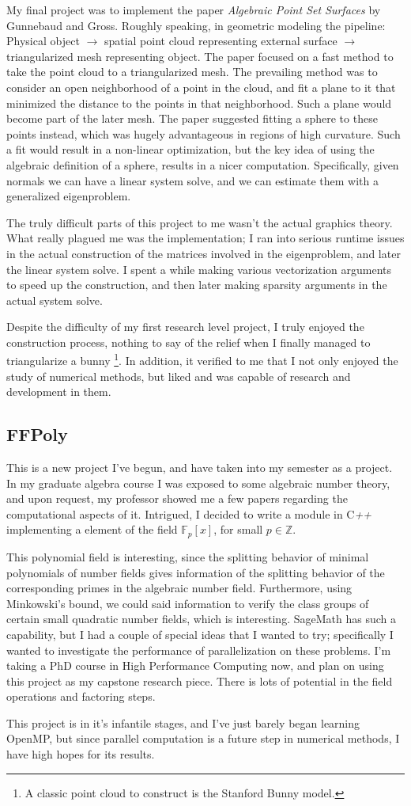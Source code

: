 \documentclass[12pt]{article}
\begin{document}
My final project was to implement the paper \textit{Algebraic Point Set
Surfaces} by Gunnebaud and Gross. Roughly speaking, in geometric modeling the
pipeline: Physical object $\to$ spatial point cloud representing external
surface $\to$ triangularized mesh representing object. The paper focused on a
fast method to take the point cloud to a triangularized mesh. The prevailing
method was to consider an open neighborhood of a point in the cloud, and fit a
plane to it that minimized the distance to the points in that neighborhood. Such
a plane would become part of the later mesh. The paper suggested fitting a
sphere to these points instead, which was hugely advantageous in regions of high
curvature. Such a fit would result in a non-linear optimization, but the key
idea of using the algebraic definition of a sphere, results in a nicer
computation. Specifically, given normals we can have a linear system solve,
and we can estimate them with a generalized eigenproblem.

The truly difficult parts of this project to me wasn't the actual graphics
theory. What really plagued me was the implementation; I ran into serious
runtime issues in the actual construction of the matrices involved in the
eigenproblem, and later the linear system solve. I spent a while making various
vectorization arguments to speed up the construction, and then later making
sparsity arguments in the actual system solve. 

Despite the difficulty of my first research level project, I truly enjoyed the
construction process, nothing to say of the relief when I finally managed to
triangularize a bunny \footnote{A classic point cloud to construct is the
Stanford Bunny model.}. In addition, it verified to me that I not only enjoyed
the study of numerical methods, but liked and was capable of research and
development in them.

\subsection{FFPoly}

This is a new project I've begun, and have taken into my semester as a project.
In my graduate algebra course I was exposed to some algebraic number theory, and
upon request, my professor showed me a few papers regarding the computational
aspects of it. Intrigued, I decided to write a module in C\textit{++}
implementing a element of the field $\mathbb{F}_p[x]$, for small $p \in
\mathbb{Z}$. 

This polynomial field is interesting, since the splitting behavior of minimal 
polynomials of number fields gives information of the splitting behavior of the
corresponding primes in the algebraic number field. Furthermore, using
Minkowski's bound, we could said information to verify the class groups of
certain small quadratic number fields, which is interesting. SageMath has such a
capability, but I had a couple of special ideas that I wanted to try;
specifically I wanted to investigate the performance of parallelization on these
problems. I'm taking a PhD course in High Performance Computing now, and plan on
using this project as my capstone research piece. There is lots of potential in
the field operations and factoring steps.

This project is in it's infantile stages, and I've just barely began learning
OpenMP, but since parallel computation is a future step in numerical methods, I
have high hopes for its results.
\end{document}
